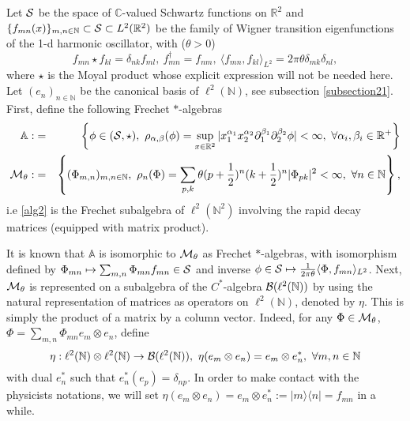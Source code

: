 \documentclass[a4paper,11pt,twoside]{article}
\numberwithin{equation}{section}
\theoremstyle{nonumberplain}
\begin{document}
Let ${\cal{S}}$ be the space of $\mathbb{C}$-valued Schwartz functions on $\mathbb{R}^2$ and $\{f_{mn}(x) \}_{m,n\in\mathbb{N}}\subset{\cal{S}}\subset L^2(\mathbb{R}^2)$ be the family of Wigner transition eigenfunctions of the 1-d harmonic oscillator, with ($\theta>0$)
\begin{equation}
f_{mn}\star f_{kl}=\delta_{nk}f_{ml},\ f_{mn}^\dag=f_{nm},\ \langle f_{mn},f_{kl} \rangle_{L^2}=2\pi\theta\delta_{mk}\delta_{nl}\label{matrix-base-basic},
\end{equation}
where $\star$ is the Moyal product whose explicit expression will not be needed here. Let $(e_n)_{n\in\mathbb{N}}$ be the canonical basis of $\ell^2(\mathbb{N})$, see subsection \ref{subsection21}. First, define the following Frechet $*$-algebras
\begin{eqnarray}
{\mathbb{A}}:&=&\left\{\phi\in({\cal{S}},\star),\ \rho_{\alpha,\beta}(\phi)=\sup_{x\in\mathbb{R}^2}|x_1^{\alpha_1}x_2^{\alpha_2}\partial_1^{\beta_1}\partial_2^{\beta_2}\phi|<\infty,\ \forall \alpha_i,\beta_i\in\mathbb{R}^+ \right\}\label{alg1}\\
{\cal{M}}_\theta:&=&\left\{(\Phi_{m,n})_{m,n\in\mathbb{N}},\ \rho_n(\Phi)=\sum_{p,k}\theta(p+\frac{1}{2})^n(k+\frac{1}{2})^n|\Phi_{pk}|^2<\infty,\ \forall n\in\mathbb{N}\right\}\label{alg2},
\end{eqnarray}
i.e \eqref{alg2} is the Frechet subalgebra of $\ell^2(\mathbb{N}^2)$ involving the rapid decay matrices (equipped with matrix product).\par
It is known that ${\mathbb{A}}$ is isomorphic to ${\cal{M}}_\theta$ as Frechet $*$-algebras, with isomorphism defined by $\Phi_{mn}\mapsto \sum_{m,n}\Phi_{mn}f_{mn}\in{\cal{S}}$ and inverse $\phi\in{\cal{S}}\mapsto\frac{1}{2\pi\theta}\langle \Phi,f_{mn}\rangle_{L^2}$. Next, ${\cal{M}}_\theta$ is represented on a subalgebra of the $C^*$-algebra  ${\cal{B}}(\ell^2(\mathbb{N}))$ by using the natural representation of matrices as operators on $\ell^2(\mathbb{N})$, denoted by $\eta$. This is simply the product of a matrix by a column vector. Indeed, for any $\Phi\in{\cal{M}}_\theta$, $\Phi=\sum_{m,n}\Phi_{mn}e_m\otimes e_n$, define
\begin{equation}
\eta:\ell^2(\mathbb{N})\otimes\ell^2(\mathbb{N})\to{\cal{B}}(\ell^2(\mathbb{N})),\ \eta(e_m\otimes e_n)=e_m\otimes e^*_n,\ \forall m,n\in\mathbb{N}\nonumber
\end{equation}
with dual $e^*_n$ such that $e^*_n(e_p)=\delta_{np}$. In order to make contact with the physicists notations, we will set $\eta(e_m\otimes e_n)=e_m\otimes e^*_n:=|m\rangle\langle n|=f_{mn}$ in a while. \par
\end{document}
